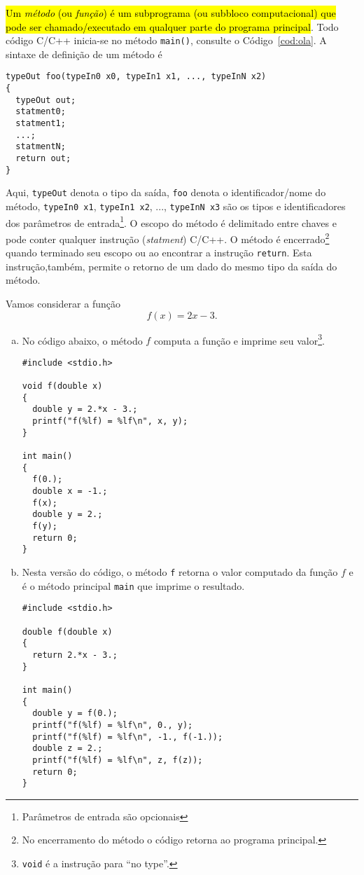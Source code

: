 \documentclass[12pt]{article}
\begin{document}
\hl{Um \emph{método} (ou \emph{função}) é um subprograma (ou subbloco computacional) que pode ser chamado/executado em qualquer parte do programa principal}. Todo código C/C++ inicia-se no método \lstinline+main()+, consulte o Código~\ref{cod:ola}. A sintaxe de definição de um método é
\begin{lstlisting}
typeOut foo(typeIn0 x0, typeIn1 x1, ..., typeInN x2)
{
  typeOut out;
  statment0;
  statment1;
  ...;
  statmentN;
  return out;
}
\end{lstlisting}
Aqui, \lstinline+typeOut+ denota o tipo da saída, \lstinline+foo+ denota o identificador/nome do método, \lstinline+typeIn0 x1+, \lstinline+typeIn1 x2+, ..., \lstinline+typeInN x3+ são os tipos e identificadores dos parâmetros de entrada\footnote{Parâmetros de entrada são opcionais}. O escopo do método é delimitado entre chaves e pode conter qualquer instrução (\textit{statment}) C/C++. O método é encerrado\footnote{No encerramento do método o código retorna ao programa principal.} quando terminado seu escopo ou ao encontrar a instrução \lstinline+return+. Esta instrução,também, permite o retorno de um dado do mesmo tipo da saída do método.

\begin{ex}
  Vamos considerar a função
  \begin{equation}
    f(x) = 2x - 3.
  \end{equation}

  \begin{enumerate}[a)]
  \item No código abaixo, o método $f$ computa a função e imprime seu valor\footnote{\lstinline+void+ é a instrução para ``no type''.}.
\begin{lstlisting}[caption=method.cc]
#include <stdio.h>

void f(double x)
{
  double y = 2.*x - 3.;
  printf("f(%lf) = %lf\n", x, y);
}

int main()
{
  f(0.);
  double x = -1.;
  f(x);
  double y = 2.;
  f(y);
  return 0;
}      
\end{lstlisting}

  \item Nesta versão do código, o método \lstinline+f+ retorna o valor computado da função $f$ e é o método principal \lstinline+main+ que imprime o resultado.
\begin{lstlisting}
#include <stdio.h>

double f(double x)
{
  return 2.*x - 3.;
}

int main()
{
  double y = f(0.);
  printf("f(%lf) = %lf\n", 0., y);
  printf("f(%lf) = %lf\n", -1., f(-1.));
  double z = 2.;
  printf("f(%lf) = %lf\n", z, f(z));
  return 0;
}
\end{lstlisting}
  \end{enumerate}  
\end{ex}
\end{document}

